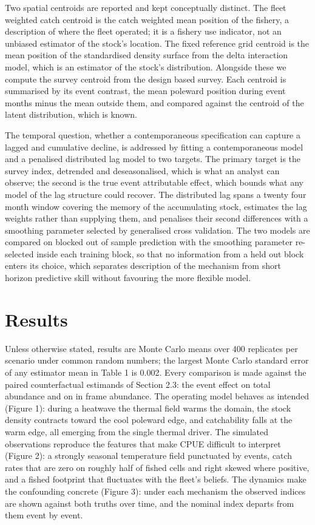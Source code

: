 \documentclass[
  11pt,
  a4paper,
]{article}
\begin{document}
Two spatial centroids are reported and kept conceptually distinct. The
fleet weighted catch centroid is the catch weighted mean position of the
fishery, a description of where the fleet operated; it is a fishery use
indicator, not an unbiased estimator of the stock's location. The fixed
reference grid centroid is the mean position of the standardised density
surface from the delta interaction model, which is an estimator of the
stock's distribution. Alongside these we compute the survey centroid
from the design based survey. Each centroid is summarised by its event
contrast, the mean poleward position during event months minus the mean
outside them, and compared against the centroid of the latent
distribution, which is known.

The temporal question, whether a contemporaneous specification can
capture a lagged and cumulative decline, is addressed by fitting a
contemporaneous model and a penalised distributed lag model to two
targets. The primary target is the survey index, detrended and
deseasonalised, which is what an analyst can observe; the second is the
true event attributable effect, which bounds what any model of the lag
structure could recover. The distributed lag spans a twenty four month
window covering the memory of the accumulating stock, estimates the lag
weights rather than supplying them, and penalises their second
differences with a smoothing parameter selected by generalised cross
validation. The two models are compared on blocked out of sample
prediction with the smoothing parameter re-selected inside each training
block, so that no information from a held out block enters its choice,
which separates description of the mechanism from short horizon
predictive skill without favouring the more flexible model.

\hypertarget{results}{%
\section{Results}\label{results}}

Unless otherwise stated, results are Monte Carlo means over 400
replicates per scenario under common random numbers; the largest Monte
Carlo standard error of any estimator mean in Table 1 is 0.002. Every
comparison is made against the paired counterfactual estimands of
Section 2.3: the event effect on total abundance and on in frame
abundance. The operating model behaves as intended (Figure 1): during a
heatwave the thermal field warms the domain, the stock density contracts
toward the cool poleward edge, and catchability falls at the warm edge,
all emerging from the single thermal driver. The simulated observations
reproduce the features that make CPUE difficult to interpret (Figure 2):
a strongly seasonal temperature field punctuated by events, catch rates
that are zero on roughly half of fished cells and right skewed where
positive, and a fished footprint that fluctuates with the fleet's
beliefs. The dynamics make the confounding concrete (Figure 3): under
each mechanism the observed indices are shown against both truths over
time, and the nominal index departs from them event by event.
\end{document}
